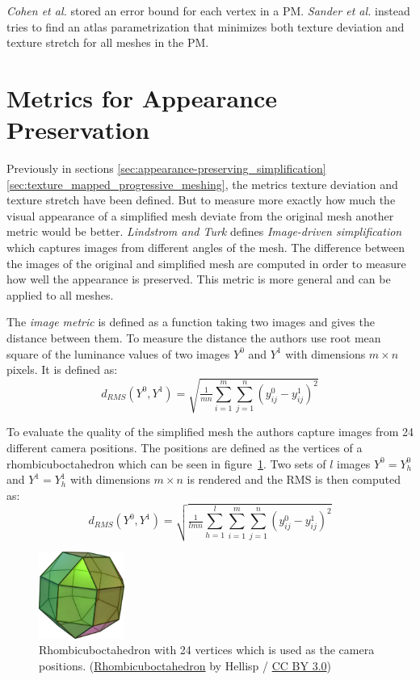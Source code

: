 \emph{Cohen et al.} \cite{cohen1998appearance} stored an error bound for each vertex in a PM. \emph{Sander et al.} \cite{sander2001texture} instead tries to find an atlas parametrization that minimizes both texture deviation and texture stretch for all meshes in the PM. 

\section{Metrics for Appearance Preservation} \label{sec:metrics_for_appearance_preservation}
Previously in sections \ref{sec:appearance-preserving_simplification}\ref{sec:texture_mapped_progressive_meshing}, the metrics texture deviation and texture stretch have been defined. But to measure more exactly how much the visual appearance of a simplified mesh deviate from the original mesh another metric would be better. \emph{Lindstrom and Turk} \cite{lindstrom2000image} defines \emph{Image-driven simplification} which captures images from different angles of the mesh. The difference between the images of the original and simplified mesh are computed in order to measure how well the appearance is preserved. This metric is more general and can be applied to all meshes.

The \emph{image metric} is defined as a function taking two images and gives the distance between them. To measure the distance the authors use root mean square of the luminance values of two images $Y^0$ and $Y^1$ with dimensions $m \times n$ pixels. It is defined as:
\begin{equation*}
  d_{RMS}(Y^0,Y^1) = \sqrt{\tfrac{1}{mn}\sum^m_{i=1}\sum^n_{j=1}(y^0_{ij} - y^1_{ij})^2}
\end{equation*}

To evaluate the quality of the simplified mesh the authors capture images from 24 different camera positions. The positions are defined as the vertices of a rhombicuboctahedron which can be seen in figure~\ref{fig:rhombicuboctahedron}. Two sets of $l$ images $Y^0 = {Y^0_h}$ and $Y^1 = {Y^1_h}$ with dimensions $m \times n$ is rendered and the RMS is then computed as:
\begin{equation*}
  d_{RMS}(Y^0,Y^1) = \sqrt{\tfrac{1}{lmn}\sum^l_{h=1}\sum^m_{i=1}\sum^n_{j=1}(y^0_{ij} - y^1_{ij})^2}
\end{equation*}

\begin{figure}[h]
    \centering
    \includegraphics[width=0.25\textwidth]{figures/591px-Rhombicuboctahedron.jpg}
    \caption{Rhombicuboctahedron with 24 vertices which is used as the camera positions. 
      (\href{https://commons.wikimedia.org/wiki/File:Rhombicuboctahedron.jpg}{Rhombicuboctahedron} by Hellisp / \href{https://creativecommons.org/licenses/by/3.0/}{CC BY 3.0})}
    \label{fig:rhombicuboctahedron}
\end{figure}


